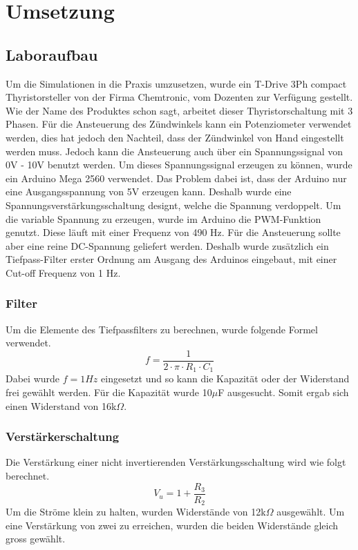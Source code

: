 \section{Umsetzung}


\subsection{Laboraufbau}
Um die Simulationen in die Praxis umzusetzen, wurde ein \grqq T-Drive 3Ph compact Thyristorsteller\grqq \hspace{0.03cm} von der Firma Chemtronic, vom Dozenten zur Verfügung gestellt. Wie der Name des Produktes schon sagt, arbeitet dieser Thyristorschaltung mit 3 Phasen. Für die Ansteuerung des Zündwinkels kann ein Potenziometer verwendet werden, dies hat jedoch den Nachteil, dass der Zündwinkel von Hand eingestellt werden muss. Jedoch kann die Ansteuerung auch über ein Spannungssignal von 0V - 10V benutzt werden. Um dieses Spannungssignal erzeugen zu können, wurde ein Arduino Mega 2560 verwendet. Das Problem dabei ist, dass der Arduino nur eine Ausgangsspannung von 5V erzeugen kann. Deshalb wurde eine Spannungsverstärkungsschaltung designt, welche die Spannung verdoppelt. Um die variable Spannung zu erzeugen, wurde im Arduino die PWM-Funktion genutzt. Diese läuft mit einer Frequenz von 490 Hz. Für die Ansteuerung sollte aber eine reine DC-Spannung geliefert werden. Deshalb wurde zusätzlich ein Tiefpass-Filter erster Ordnung am Ausgang des Arduinos eingebaut, mit einer Cut-off Frequenz von 1 Hz.  


\subsubsection{Filter}
Um die Elemente des Tiefpassfilters zu berechnen, wurde folgende Formel verwendet.
\begin{equation}
f = \frac{1}{2 \cdot \pi \cdot R_1 \cdot C_1}
\end{equation}
Dabei wurde $f = 1 Hz$ eingesetzt und so kann die Kapazität oder der Widerstand frei gewählt werden. Für die Kapazität wurde 10$\mu$F ausgesucht. Somit ergab sich einen Widerstand von 16k$\Omega$. 


\subsubsection{Verstärkerschaltung}
Die Verstärkung einer nicht invertierenden Verstärkungsschaltung wird wie folgt berechnet.
\begin{equation}
V_u = 1 + \frac{R_3}{R_2}
\end{equation}
Um die Ströme klein zu halten, wurden Widerstände von 12k$\Omega$ ausgewählt. Um eine Verstärkung von zwei zu erreichen, wurden die beiden Widerstände gleich gross gewählt. 

